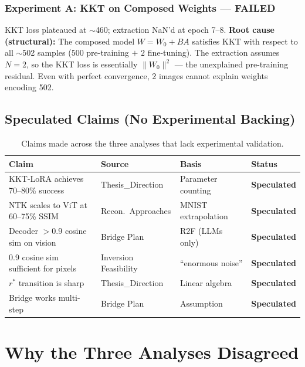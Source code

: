 \documentclass[11pt,a4paper]{article}
\newcommand{\speculated}[1]{\textcolor{speculated}{\textbf{#1}}}
\newcommand{\failed}[1]{\textcolor{failed}{\textbf{#1}}}
\begin{document}
\subsubsection{Experiment A: KKT on Composed Weights --- \failed{FAILED}}

KKT loss plateaued at $\sim$460; extraction NaN'd at epoch 7--8. \textbf{Root cause (structural):} The composed model $W = W_0 + BA$ satisfies KKT with respect to all $\sim$502 samples ($500$ pre-training $+$ $2$ fine-tuning). The extraction assumes $N\!=\!2$, so the KKT loss is essentially $\|W_0\|^2$ --- the unexplained pre-training residual. Even with perfect convergence, 2 images cannot explain weights encoding 502.

\subsection{Speculated Claims (No Experimental Backing)}

\begin{table}[H]
\centering
\caption{Claims made across the three analyses that lack experimental validation.}
\label{tab:speculated}
\small
\begin{tabularx}{\textwidth}{Xlll}
\toprule
\textbf{Claim} & \textbf{Source} & \textbf{Basis} & \textbf{Status} \\
\midrule
KKT-LoRA achieves 70--80\% success &
    Thesis\_Direction & Parameter counting & \speculated{Speculated} \\
NTK scales to ViT at 60--75\% SSIM &
    Recon.\ Approaches & MNIST extrapolation & \speculated{Speculated} \\
Decoder $>$0.9 cosine sim on vision &
    Bridge Plan & R2F (LLMs only) & \speculated{Speculated} \\
0.9 cosine sim sufficient for pixels &
    Inversion Feasibility & ``enormous noise'' & \speculated{Speculated} \\
$r^*$ transition is sharp &
    Thesis\_Direction & Linear algebra & \speculated{Speculated} \\
Bridge works multi-step &
    Bridge Plan & Assumption & \speculated{Speculated} \\
\bottomrule
\end{tabularx}
\end{table}


\section{Why the Three Analyses Disagreed}
\end{document}
